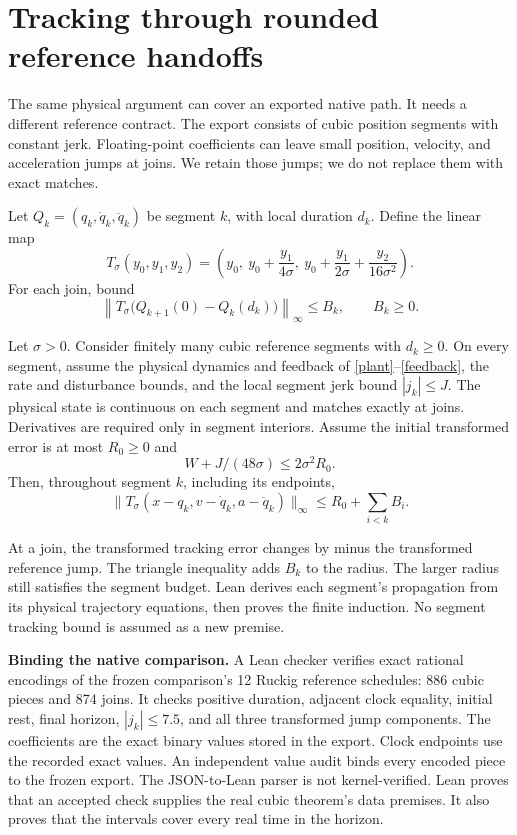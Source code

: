 \section{Tracking through rounded reference handoffs}\label{rounded}
The same physical argument can cover an exported native path. It needs a different reference contract. The export consists of cubic position segments with constant jerk. Floating-point coefficients can leave small position, velocity, and acceleration jumps at joins. We retain those jumps; we do not replace them with exact matches.

Let $Q_k=(q_k,\dot q_k,\ddot q_k)$ be segment $k$, with local duration $d_k$. Define the linear map
\[
T_\sigma(y_0,y_1,y_2)=
\left(y_0,\ y_0+\frac{y_1}{4\sigma},\
y_0+\frac{y_1}{2\sigma}+\frac{y_2}{16\sigma^2}\right).
\]
For each join, bound
\[
\left\|T_\sigma\bigl(Q_{k+1}(0)-Q_k(d_k)\bigr)\right\|_\infty\leq B_k,
\qquad B_k\geq0.
\]
\begin{theorem}
Let $\sigma>0$. Consider finitely many cubic reference segments with $d_k\geq0$. On every segment, assume the physical dynamics and feedback of \eqref{plant}--\eqref{feedback}, the rate and disturbance bounds, and the local segment jerk bound $|j_k|\leq J$. The physical state is continuous on each segment and matches exactly at joins. Derivatives are required only in segment interiors. Assume the initial transformed error is at most $R_0\geq0$ and
\[
W+J/(48\sigma)\leq2\sigma^2R_0.
\]
Then, throughout segment $k$, including its endpoints,
\[
\|T_\sigma(x-q_k,v-\dot q_k,a-\ddot q_k)\|_\infty
\leq R_0+\sum_{i<k}B_i.
\]
\end{theorem}
At a join, the transformed tracking error changes by minus the transformed reference jump. The triangle inequality adds $B_k$ to the radius. The larger radius still satisfies the segment budget. Lean derives each segment's propagation from its physical trajectory equations, then proves the finite induction. No segment tracking bound is assumed as a new premise.

\textbf{Binding the native comparison.} A Lean checker verifies exact rational encodings of the frozen comparison's 12 Ruckig reference schedules: 886 cubic pieces and 874 joins. It checks positive duration, adjacent clock equality, initial rest, final horizon, $|j_k|\leq7.5$, and all three transformed jump components. The coefficients are the exact binary values stored in the export. Clock endpoints use the recorded exact values. An independent value audit binds every encoded piece to the frozen export. The JSON-to-Lean parser is not kernel-verified. Lean proves that an accepted check supplies the real cubic theorem's data premises. It also proves that the intervals cover every real time in the horizon.

